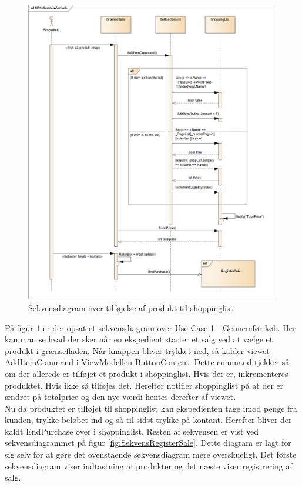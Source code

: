 \begin{figure}[H]
	\centering
	\includegraphics[width=1\textwidth]{Systemdesign/Frontend/GUI/Pics/Sekvensdiagram-TilfoejProdukt2}
	\caption{Sekvensdiagram over tilføjelse af produkt til shoppinglist}
	\label{fig:SekvensUC1}
\end{figure}

På figur \ref{fig:SekvensUC1} er der opsat et sekvensdiagram over Use Case 1 - Gennemfør køb. Her kan man se hvad der sker når en ekspedient starter et salg ved at vælge et produkt i grænsefladen. Når knappen bliver trykket ned, så kalder viewet AddItemCommand i ViewModellen ButtonContent. Dette command tjekker så om der allerede er tilføjet et produkt i shoppinglist. Hvis der er, inkrementeres produktet. Hvis ikke så tilføjes det. Herefter notifier shoppinglist på at der er ændret på totalprice og den nye værdi hentes derefter af viewet. \\
Nu da produktet er tilføjet til shoppinglist kan ekspedienten tage imod penge fra kunden, trykke beløbet ind og så til sidst trykke på kontant. Herefter bliver der kaldt EndPurchase over i shoppinglist. Resten af sekvensen er vist ved sekvensdiagrammet på figur \ref{fig:SekvensRegisterSale}. Dette diagram er lagt for sig selv for at gøre det ovenstående sekvensdiagram mere overskueligt. Det første sekvensdiagram viser indtastning af produkter og det næste viser registrering af salg.

